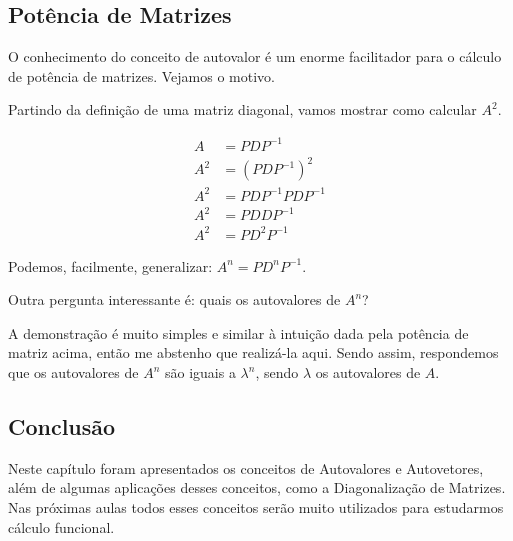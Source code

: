 \documentclass[12pt]{article}
\begin{document}
\subsection{Potência de Matrizes}

O conhecimento do conceito de autovalor é um enorme facilitador para o cálculo de potência de matrizes. Vejamos o motivo.

Partindo da definição de uma matriz diagonal, vamos mostrar como calcular $A^2$.

\begin{align*}
	A&=PDP^{-1}\\
	A^2&=(PDP^{-1})^2\\
	A^2&=PDP^{-1}PDP^{-1}\\
	A^2&=PDDP^{-1}\\
	A^2&=PD^2P^{-1}
\end{align*}

Podemos, facilmente, generalizar: $A^n=PD^nP^{-1}$.

Outra pergunta interessante é: quais os autovalores de $A^n$?

A demonstração é muito simples e similar à intuição dada pela potência de matriz acima, então me abstenho que realizá-la aqui. Sendo assim, respondemos que os autovalores de $A^n$ são iguais a $\lambda^n$, sendo $\lambda$ os autovalores de $A$. 

\subsection{Conclusão}
Neste capítulo foram apresentados os conceitos de  Autovalores e Autovetores, além de algumas aplicações desses conceitos, como a Diagonalização de Matrizes. Nas próximas aulas todos esses conceitos serão muito utilizados para estudarmos cálculo funcional. 
\end{document}
